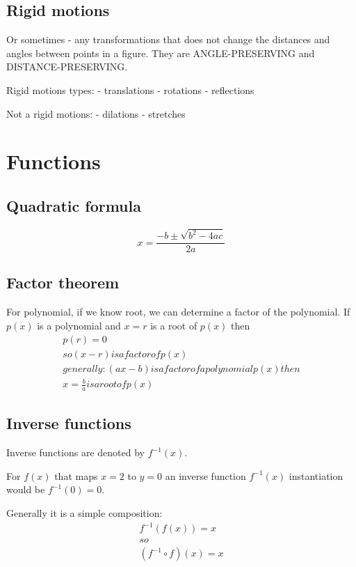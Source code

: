 \documentclass{article}
\begin{document}
\subsection{Rigid motions}
Or sometimes - any transformations that does not change the distances
and angles between points in a figure. They are ANGLE-PRESERVING and
DISTANCE-PRESERVING.

Rigid motions types:
- translations
- rotations
- reflections

Not a rigid motions:
- dilations
- stretches


\section{Functions}
\subsection{Quadratic formula}
\begin{equation}
  x = \frac{-b \pm \sqrt{b^2 - 4ac}}{2a}
\end{equation}

\subsection{Factor theorem}
For polynomial, if we know root, we can determine a factor of the
polynomial. If $p(x)$ is a polynomial and $x=r$ is a root of $p(x)$ then
\begin{equation}
  \begin{gathered}
  p(r) = 0 \\
  so (x-r) is a factor of p(x) \\
  generally: (ax-b) is a factor of a polynomial p(x) then \\
  x = \frac{b}{a} is a root of p(x)
\end{gathered}
\end{equation}

\subsection{Inverse functions}
Inverse functions are denoted by $f^{-1}(x)$.

For $f(x)$ that maps $x=2$ to $y=0$ an inverse function $f^{-1}(x)$ instantiation would be
$f^{-1}(0)=0$.

Generally it is a simple composition:
\begin{equation}
  \begin{gathered}
    f^{-1}(f(x)) = x \\
    so \\
    (f^{-1} \circ f)(x) = x
  \end{gathered}
\end{equation}
\end{document}
